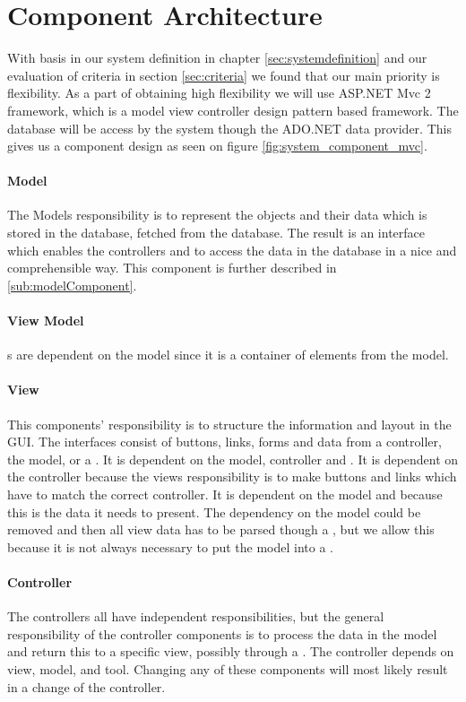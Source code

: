 \section{Component Architecture}
\label{sec:components}
With basis in our system definition in chapter \ref{sec:systemdefinition} and our evaluation of criteria in section \ref{sec:criteria} we found that our main priority is flexibility. 
As a part of obtaining high flexibility we will use ASP.NET Mvc 2 framework, which is a model view controller design pattern based framework.
The database will be access by the system though the ADO.NET data provider. This gives us a component design as seen on figure \ref{fig:system_component_mvc}. 


\paragraph{Model}
The Models responsibility is to represent the objects and their data which is stored in the database, fetched from the database. The result is an interface which enables the controllers and \viewmodel[] to access the data in the database in a nice and comprehensible way. This component is further described in \ref{sub:modelComponent}.

\paragraph{View Model}
\viewmodel[c]s are dependent on the model since it is a container of elements from the model.


\paragraph{View} 
This components' responsibility is to structure the information and layout in the GUI. 
The interfaces consist of buttons, links, forms and data from a controller, the model, or a \viewmodel[]. 
It is dependent on the model, controller and \viewmodel[]. It is dependent on the controller because the views responsibility is to make buttons and links which have to match the correct controller. It is dependent on the model and \viewmodel[] because this is the data it needs to present. 
The dependency on the model could be removed and then all view data has to be parsed though a \viewmodel[], but we allow this because it is not always necessary to put the model into a \viewmodel[]. 

\paragraph{Controller}
The controllers all have independent responsibilities, but the general responsibility of the controller components is to process the data in the model and return this to a specific view, possibly through a \viewmodel[]. The controller depends on view, model, \viewmodel[] and tool. Changing any of these components will most likely result in a change of the controller. 

